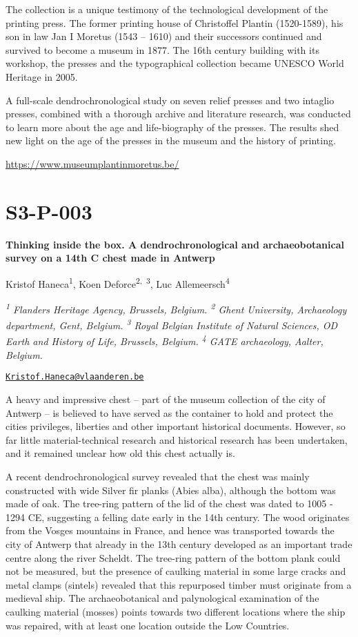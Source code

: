 \documentclass[
]{book}
\begin{document}
The collection is a unique testimony of the technological development of the printing press. The former printing house of Christoffel Plantin (1520-1589), his son in law Jan I Moretus (1543 -- 1610) and their successors continued and survived to become a museum in 1877. The 16th century building with its workshop, the presses and the typographical collection became UNESCO World Heritage in 2005.

A full-scale dendrochronological study on seven relief presses and two intaglio presses, combined with a thorough archive and literature research, was conducted to learn more about the age and life-biography of the presses. The results shed new light on the age of the presses in the museum and the history of printing.

\url{https://www.museumplantinmoretus.be/}

\hypertarget{s3-p-003}{%
\section*{S3-P-003}\label{s3-p-003}}

\textbf{Thinking inside the box. A dendrochronological and archaeobotanical survey on a 14th C chest made in Antwerp}

Kristof Haneca\textsuperscript{1}, Koen Deforce\textsuperscript{2,~3}, Luc Allemeersch\textsuperscript{4}

\emph{\textsuperscript{1} Flanders Heritage Agency, Brussels, Belgium. \textsuperscript{2} Ghent University, Archaeology department, Gent, Belgium. \textsuperscript{3} Royal Belgian Institute of Natural Sciences, OD Earth and History of Life, Brussels, Belgium. \textsuperscript{4} GATE archaeology, Aalter, Belgium.}

\href{mailto:Kristof.Haneca@vlaanderen.be}{\nolinkurl{Kristof.Haneca@vlaanderen.be}}

A heavy and impressive chest -- part of the museum collection of the city of Antwerp -- is believed to have served as the container to hold and protect the cities privileges, liberties and other important historical documents. However, so far little material-technical research and historical research has been undertaken, and it remained unclear how old this chest actually is.

A recent dendrochronological survey revealed that the chest was mainly constructed with wide Silver fir planks (Abies alba), although the bottom was made of oak. The tree-ring pattern of the lid of the chest was dated to 1005 - 1294 CE, suggesting a felling date early in the 14th century. The wood originates from the Vosges mountains in France, and hence was transported towards the city of Antwerp that already in the 13th century developed as an important trade centre along the river Scheldt. The tree-ring pattern of the bottom plank could not be measured, but the presence of caulking material in some large cracks and metal clamps (sintels) revealed that this repurposed timber must originate from a medieval ship. The archaeobotanical and palynological examination of the caulking material (mosses) points towards two different locations where the ship was repaired, with at least one location outside the Low Countries.
\end{document}
